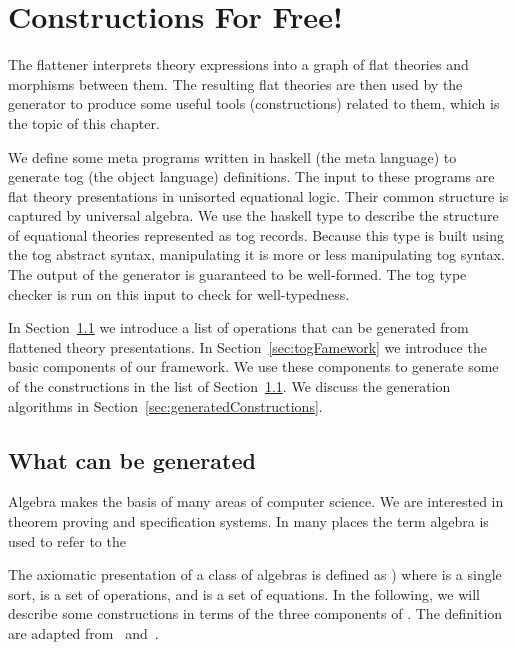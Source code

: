 \chapter{Constructions For Free!}
\label{ch:generation}

The flattener interprets theory expressions into a graph of flat theories and morphisms between them. The resulting flat theories are then used by the generator to produce some useful tools (constructions) related to them, which is the topic of this chapter. 

We define some meta programs written in haskell (the meta language) to generate tog (the object language) definitions. 
The input to these programs are flat theory presentations in unisorted equational logic. Their common structure is captured by universal algebra. We use the haskell type  to describe the structure of equational theories represented as tog records. Because this type is built using the tog abstract syntax, manipulating it is more or less manipulating tog syntax. The output of the generator is guaranteed to be well-formed. The tog type checker is run on this input to check for well-typedness. 

In Section~\ref{sec:toBeGenerated} we introduce a list of operations that can be generated from flattened theory presentations. In Section~\ref{sec:togFamework} we introduce the basic components of our framework. We use these components to generate some of the constructions in the list of Section~\ref{sec:toBeGenerated}. We discuss the generation algorithms in Section~\ref{sec:generatedConstructions}. 

\section{What can be generated}
\label{sec:toBeGenerated}
Algebra makes the basis of many areas of computer science. We are interested in theorem proving and specification systems.   In many places the term algebra is used to refer to the 

The axiomatic presentation of a class of algebras is defined as ) where  is a single sort,  is a set of operations, and  is a set of equations.  In the following, we will describe some constructions in terms of the three components of . The definition are adapted from~\cite{ehrig1985fundamentals} and~\cite{handbook1993Maibaum}.  

